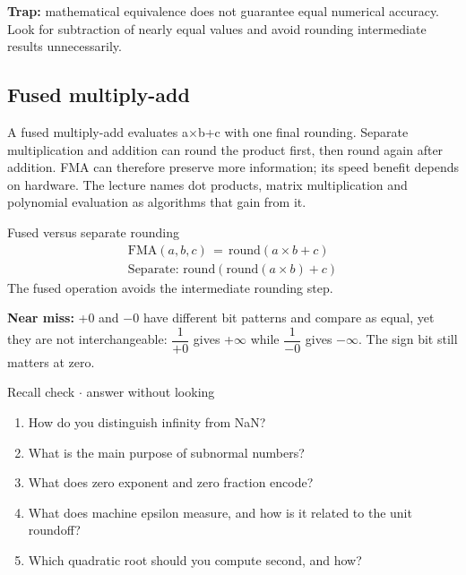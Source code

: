 \documentclass[11pt]{article}
\begin{document}
\begin{keepsection}
\begin{keepsection}
\begin{notebox}\textbf{Trap:} mathematical equivalence does not guarantee equal numerical accuracy. Look for subtraction of nearly equal values and avoid rounding intermediate results unnecessarily.\end{notebox}
\end{keepsection}

\begin{keepsection}
\subsection{Fused multiply-add}

A fused multiply-add evaluates a\ensuremath{\times}b+c with one final rounding. Separate multiplication and addition can round the product first, then round again after addition. FMA can therefore preserve more information; its speed benefit depends on hardware. The lecture names dot products, matrix multiplication and polynomial evaluation as algorithms that gain from it.

\begin{equationcard}{Fused versus separate rounding}
\[ \begin{gathered} \text{FMA}({a},{b},{c})\, =\, \text{round}({a}\times {b}+{c}) \\ \text{Separate}:\, \text{round}(\text{round}({a}\times {b})+{c}) \end{gathered} \]
{\small The fused operation avoids the intermediate rounding step.}
\end{equationcard}

\begin{notebox}\textbf{Near miss:} +0 and \ensuremath{-}0 have different bit patterns and compare as equal, yet they are not interchangeable: {\small\ensuremath{\dfrac{1}{+0}}} gives +\ensuremath{\infty} while {\small\ensuremath{\dfrac{1}{-0}}} gives \ensuremath{-}\ensuremath{\infty}. The sign bit still matters at zero.\end{notebox}

\begin{recallbox}{Recall check \ensuremath{\cdot} answer without looking}
\begin{enumerate}
\item How do you distinguish infinity from NaN?
\item What is the main purpose of subnormal numbers?
\item What does zero exponent and zero fraction encode?
\item What does machine epsilon measure, and how is it related to the unit roundoff?
\item Which quadratic root should you compute second, and how?
\end{enumerate}

\end{recallbox}
\end{keepsection}
\end{keepsection}
\end{document}
